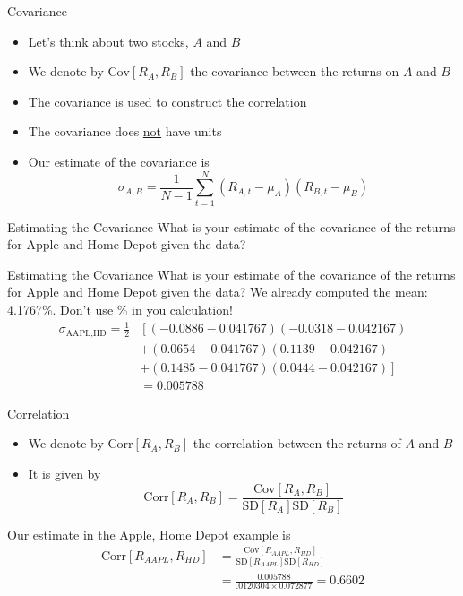 \documentclass{beamer}
\begin{document}
\begin{frame}{Covariance}
	\begin{itemize}
		\item Let's think about two stocks, $A$ and $B$	
		\item We denote by $\text{Cov}[R_{A},R_{B}]$ the covariance between the returns on $A$ and $B$
		\item The covariance is used to construct the correlation
		\item The covariance does \underline{not} have units
		\item Our \underline{estimate} of the covariance is 
		\begin{equation*}
			\sigma_{A,B}=\frac{1}{N-1}\sum_{t=1}^{N}{(R_{A,t}-\mu_{A})(R_{B,t}-\mu_{B})}
		\end{equation*}
	\end{itemize}
\end{frame}
\begin{frame}{Estimating the Covariance}
	What is your estimate of the covariance of the returns for Apple and Home Depot given the data?
	\begin{center}
		
	\end{center}
\end{frame}

\begin{frame}{Estimating the Covariance}
	What is your estimate of the covariance of the returns for Apple and Home Depot given the data?
	\pause
	{\color{blue}
	We already computed the mean: 4.1767\%. Don't use \% in you calculation! 
	\begin{align*}
		\sigma_{\text{AAPL,HD}}=\frac{1}{2}&\left[(-0.0886-0.041767)(-0.0318-0.042167)\right.\\
		&\left.+(0.0654-0.041767)(0.1139-0.042167)\right.\\
		&\left.+(0.1485-0.041767)(0.0444-0.042167)\right]\\
		&=0.005788
	\end{align*}
	}
\end{frame}

\begin{frame}{Correlation}
	\begin{itemize}
		\item We denote by $\text{Corr}[R_{A},R_{B}]$ the correlation between the returns of $A$ and $B$
		\item It is given by
			\begin{equation*}
				\text{Corr}[R_{A},R_{B}]=\frac{\text{Cov}[R_{A},R_{B}]}{\text{SD}[R_{A}]\text{SD}[R_{B}]}
			\end{equation*}
	\end{itemize}
\pause
	{\color{blue}
		 Our estimate in the Apple, Home Depot example is
			\begin{align*}
				\text{Corr}[R_{AAPL},R_{HD}]&=\frac{\text{Cov}[R_{AAPL},R_{HD}]}{\text{SD}[R_{AAPL}]\text{SD}[R_{HD}]}\\
				&=\frac{0.005788}{.0120304\times 0.072877}=0.6602
			\end{align*}
}
\end{frame}
\end{document}

